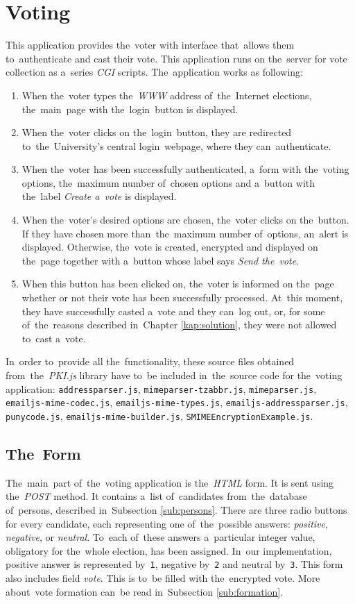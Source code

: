 \section{Voting}
This application provides the~voter with interface that~allows them to~authenticate and cast their vote. This application runs on the~server for vote collection as a~series \emph{CGI} scripts. The~application works as following:
\begin{enumerate}
\item When the~voter types the~\emph{WWW} address of~the~Internet elections, the~main~page with the~login~button is displayed. 
\item When the~voter clicks on the~login~button, they are redirected to~the~University's central login~webpage, where they can~authenticate.
\item When the~voter has been successfully authenticated, a~form with the~voting options, the~maximum number of~chosen options and a~button with the~label \emph{Create a~vote} is displayed. 
\item When the~voter's desired options are chosen, the~voter clicks on the~button. If they have chosen more than~the~maximum number of~options, an~alert is displayed. Otherwise, the~vote is created, encrypted and displayed on the~page together with a~button whose label says \emph{Send the~vote}.
\item When this button has been clicked on, the~voter is informed on the~page whether or not their vote has been successfully processed. At~this moment, they have successfully casted a~vote and they can~log out, or, for some of~the~reasons described in~Chapter \ref{kap:solution}, they were not allowed to~cast a~vote.
\end{enumerate}

In~order to~provide all the~functionality, these source files obtained from~the~\emph{PKI.js} library have to~be included in~the~source code for the~voting application: \break \texttt{addressparser.js}, \texttt{mimeparser-tzabbr.js}, \texttt{mimeparser.js}, \break \texttt{emailjs-mime-codec.js}, \texttt{emailjs-mime-types.js}, \texttt{emailjs-addressparser.js}, \break \texttt{punycode.js}, \texttt{emailjs-mime-builder.js}, \texttt{SMIMEEncryptionExample.js}.

\subsection{The~Form}
The~main~part of~the~voting application is the~\emph{HTML} form. It is sent using the~\emph{POST} method. It contains a~list of~candidates from~the~database of~persons, described in~Subsection \ref{sub:persons}. There are three radio buttons for every candidate, each representing one of~the~possible answers: \emph{positive}, \emph{negative}, or \emph{neutral}. To~each of~these answers a~particular integer value, obligatory for the~whole election, has been assigned. In~our implementation, positive answer is represented by~\texttt{1}, negative by~\texttt{2} and neutral by~\texttt{3}.
This form also includes field \emph{vote}. This is to~be filled with the~encrypted vote. More about~vote formation can~be read in~Subsection \ref{sub:formation}.

